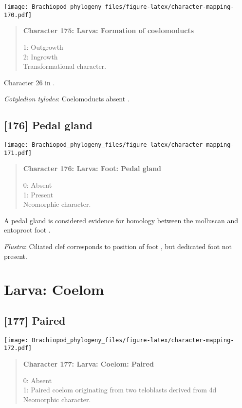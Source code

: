 \documentclass[openany]{book}
\theoremstyle{definition}
\theoremstyle{definition}
\theoremstyle{definition}
\theoremstyle{remark}
\begin{document}
\texttt{[image: Brachiopod\_phylogeny\_files/figure-latex/character-mapping-170.pdf]}

\begin{quote}
\textbf{Character 175: Larva: Formation of coelomoducts}

1: Outgrowth\\
2: Ingrowth\\
Transformational character.
\end{quote}

Character 26 in \citet{Haszprunar2000}.

\hypertarget{Cotyledion_tylodes-coding-175}{}
\emph{Cotyledion tylodes}: Coelomoducts absent \citep{Haszprunar2000}.

\subsection*{{[}176{]} Pedal gland}\label{pedal-gland}

\texttt{[image: Brachiopod\_phylogeny\_files/figure-latex/character-mapping-171.pdf]}

\begin{quote}
\textbf{Character 176: Larva: Foot: Pedal gland}

0: Absent\\
1: Present\\
Neomorphic character.
\end{quote}

A pedal gland is considered evidence for homology between the molluscan
and entoproct foot \citep{Haszprunar2008}.

\hypertarget{Flustra-coding-176}{}
\emph{Flustra}: Ciliated clef corresponds to position of foot
\citep{Reed1982}, but dedicated foot not present.

\section{Larva: Coelom}\label{larva-coelom}

\subsection*{{[}177{]} Paired}\label{paired}

\texttt{[image: Brachiopod\_phylogeny\_files/figure-latex/character-mapping-172.pdf]}

\begin{quote}
\textbf{Character 177: Larva: Coelom: Paired}

0: Absent\\
1: Paired coelom originating from two teloblasts derived from 4d\\
Neomorphic character.
\end{quote}
\end{document}
